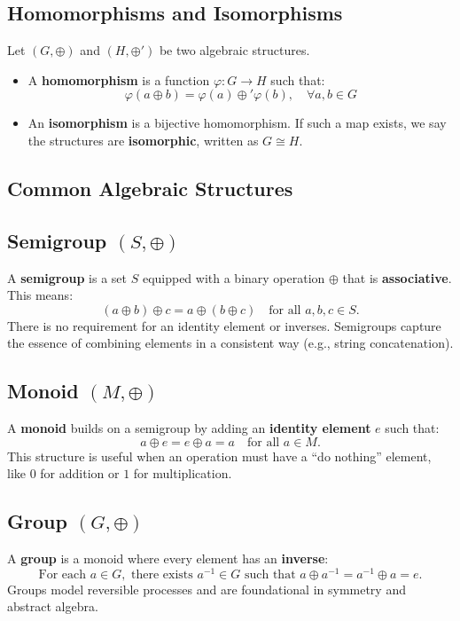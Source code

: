 \subsection{Homomorphisms and Isomorphisms}

Let \((G, \oplus)\) and \((H, \oplus')\) be two algebraic structures.

\begin{itemize}[label=\(-\)]
    \item A \textbf{homomorphism} is a function \(\varphi: G \rightarrow H\) such that:
    \[
    \varphi(a \oplus b) = \varphi(a) \oplus' \varphi(b), \quad \forall a,b \in G
    \]
    
    \item An \textbf{isomorphism} is a bijective homomorphism. If such a map exists, we say the structures are \textbf{isomorphic}, written as \(G \cong H\).
\end{itemize}

\subsection{Common Algebraic Structures}

\subsection{Semigroup \((S, \oplus)\)}
A \textbf{semigroup} is a set \(S\) equipped with a binary operation \(\oplus\) that is \textbf{associative}. This means:
\[
(a \oplus b) \oplus c = a \oplus (b \oplus c) \quad \text{for all } a, b, c \in S.
\]
There is no requirement for an identity element or inverses. Semigroups capture the essence of combining elements in a consistent way (e.g., string concatenation).

\subsection{Monoid \((M, \oplus)\)}
A \textbf{monoid} builds on a semigroup by adding an \textbf{identity element} \(e\) such that:
\[
a \oplus e = e \oplus a = a \quad \text{for all } a \in M.
\]
This structure is useful when an operation must have a “do nothing” element, like \(0\) for addition or \(1\) for multiplication.

\subsection{Group \((G, \oplus)\)}
A \textbf{group} is a monoid where every element has an \textbf{inverse}:
\[
\text{For each } a \in G, \text{ there exists } a^{-1} \in G \text{ such that } a \oplus a^{-1} = a^{-1} \oplus a = e.
\]
Groups model reversible processes and are foundational in symmetry and abstract algebra.

